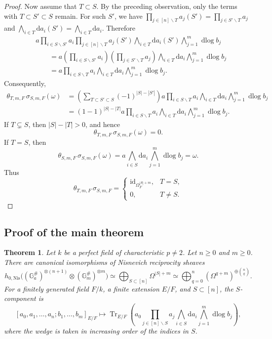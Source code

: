 \documentclass[a4paper,12pt,reqno]{amsart}
\numberwithin{equation}{section}
\newtheorem{thm}{Theorem}[section]
\theoremstyle{definition}
\DeclareMathOperator{\dlog}{dlog}
\DeclareMathOperator{\Tr}{Tr}
\newcommand{\Id}{\mathrm{id}}
\renewcommand{\d}{\mathrm{d}}
\newcommand{\GaSharp}{\mathbb{G}_{a}^{\#}}
\newcommand{\GmSharp}{\mathbb G_m^{\#}}
\newcommand{\Nis}{\mathrm{Nis}}
\begin{document}
\begin{proof}
Now assume that $T\subset S$.  By the preceding observation, only the
terms with
$T\subset S'\subset S$
remain.  For such $S'$, we have
$\prod_{j\in[n]\smallsetminus T}a_j(S')
=
\prod_{j\in S'\smallsetminus T}a_j$
and
$\bigwedge_{i\in T}\d a_i(S')
=
\bigwedge_{i\in T}\d a_i$.
Therefore
\begin{align*}
&a\prod_{i\in S\smallsetminus S'}a_i
\prod_{j\in[n]\smallsetminus T}a_j(S')
\bigwedge_{i\in T}\d a_i(S')
\bigwedge_{j=1}^m\dlog b_j\\
&\qquad=
a\left(
\prod_{i\in S\smallsetminus S'}a_i
\right)
\left(
\prod_{j\in S'\smallsetminus T}a_j
\right)
\bigwedge_{i\in T}\d a_i
\bigwedge_{j=1}^m\dlog b_j\\
&\qquad=
a\prod_{i\in S\smallsetminus T}a_i
\bigwedge_{i\in T}\d a_i
\bigwedge_{j=1}^m\dlog b_j.
\end{align*}
Consequently,
\begin{align*}
\theta_{T,m,F}\,\sigma_{S,m,F}(\omega)
&=
\left(
\sum_{T\subset S'\subset S}
(-1)^{|S|-|S'|}
\right)
a\prod_{i\in S\smallsetminus T}a_i
\bigwedge_{i\in T}\d a_i
\bigwedge_{j=1}^m\dlog b_j\\
&=
(1-1)^{|S|-|T|}
a\prod_{i\in S\smallsetminus T}a_i
\bigwedge_{i\in T}\d a_i
\bigwedge_{j=1}^m\dlog b_j.
\end{align*}
If $T\subsetneq S$, then $|S|-|T|>0$, and hence
\[
\theta_{T,m,F}\,\sigma_{S,m,F}(\omega)=0.
\]
If $T=S$, then
\[
\theta_{S,m,F}\,\sigma_{S,m,F}(\omega)
=
a\bigwedge_{i\in S}\d a_i
\bigwedge_{j=1}^m\dlog b_j
=\omega.
\]
Thus
\[
\theta_{T,m,F}\,\sigma_{S,m,F}
=
\begin{cases}
\Id_{\Omega_F^{|S|+m}},&T=S,\\
0,&T\neq S.
\end{cases}
\]
\end{proof}



\subsection{Proof of the main theorem}\label{sec:proof}

\begin{thm}\label{thm:decomp}
Let $k$ be a perfect field of characteristic $p\neq 2$.
Let $n\geq0$ and $m\ge 0$.
There are canonical isomorphisms of Nisnevich reciprocity sheaves
\begin{equation}\label{eq:mainbd}
 h_{0,\Nis}\bigl((\GaSharp)^{\otimes(n+1)}\otimes (\GmSharp)^{\otimes m}\bigr)
 \simeq
 \bigoplus_{S\subset[n]}\Omega^{|S|+m}
 \simeq
 \bigoplus_{q=0}^{n}(\Omega^{q+m})^{\oplus\binom{n}{q}}.
\end{equation}
For a finitely generated field $F/k$, a finite extension
$E/F$, and $S\subset[n]$, the $S$-component is
\begin{equation}\label{eq:fieldbd}
 [a_0,a_1,\ldots,a_n;b_1,\dots, b_m]_{E/F}
 \mapsto
 \Tr_{E/F}\left(
 a_0\prod_{j\in[n]\smallsetminus S}a_j
 \bigwedge_{i\in S}\d a_i
 \bigwedge_{j=1}^m\dlog b_j
 \right),
\end{equation}
where the wedge is taken in increasing order of the indices in $S$.
\end{thm}
\end{document}
